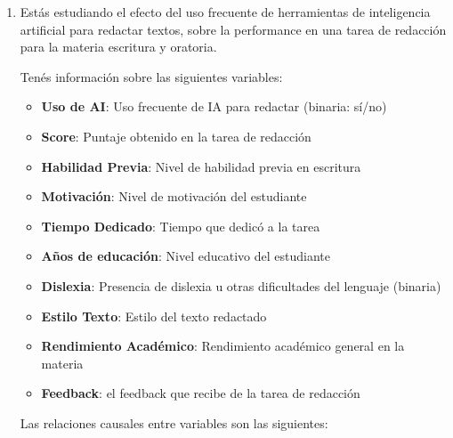 \documentclass[
  letterpaper,
  DIV=11,
  numbers=noendperiod,
  oneside]{scrreprt}
\providecommand{\tightlist}{%
  \setlength{\itemsep}{0pt}\setlength{\parskip}{0pt}}\usepackage{longtable,booktabs,array}
\begin{document}
\begin{enumerate}
\def\labelenumi{\arabic{enumi}.}
\item
  Estás estudiando el efecto del uso frecuente de herramientas de
  inteligencia artificial para redactar textos, sobre la performance en
  una tarea de redacción para la materia escritura y oratoria.

  Tenés información sobre las siguientes variables:

  \begin{itemize}
  \tightlist
  \item
    \textbf{Uso de AI}: Uso frecuente de IA para redactar (binaria:
    sí/no)
  \item
    \textbf{Score}: Puntaje obtenido en la tarea de redacción
  \item
    \textbf{Habilidad Previa}: Nivel de habilidad previa en escritura
  \item
    \textbf{Motivación}: Nivel de motivación del estudiante
  \item
    \textbf{Tiempo Dedicado}: Tiempo que dedicó a la tarea
  \item
    \textbf{Años de educación}: Nivel educativo del estudiante
  \item
    \textbf{Dislexia}: Presencia de dislexia u otras dificultades del
    lenguaje (binaria)
  \item
    \textbf{Estilo Texto}: Estilo del texto redactado
  \item
    \textbf{Rendimiento Académico}: Rendimiento académico general en la
    materia
  \item
    \textbf{Feedback}: el feedback que recibe de la tarea de redacción
  \end{itemize}

  Las relaciones causales entre variables son las siguientes:


\end{enumerate}
\end{document}
